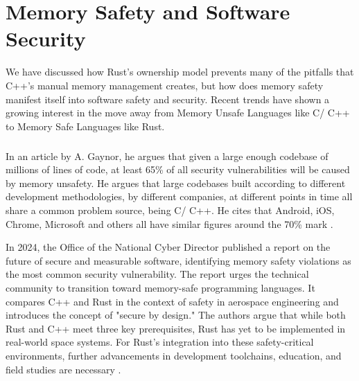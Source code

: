 \chapter{Memory Safety and Software Security}
\label{chap:safety}

We have discussed how Rust's ownership model prevents many of the pitfalls that C++'s manual memory management creates, but how does memory safety manifest itself into software safety and security. Recent trends have shown a growing interest in the move away from Memory Unsafe Languages like C/ C++ to Memory Safe Languages like Rust.

\paragraph{}

In an article by A. Gaynor, he argues that given a large enough codebase of millions of lines of code, at least 65\% of all security vulnerabilities will be caused by memory unsafety. He argues that large codebases built according to different development methodologies, by different companies, at different points in time all share a common problem source, being C/ C++. He cites that  Android, iOS, Chrome, Microsoft and others all have similar figures around the 70\% mark \cite[]{WhatScienceCan}.

In 2024, the Office of the National Cyber Director published a report on the future of secure and measurable software, identifying memory safety violations as the most common security vulnerability. The report urges the technical community to transition toward memory-safe programming languages. It compares C++ and Rust in the context of safety in aerospace engineering and introduces the concept of "secure by design." The authors argue that while both Rust and C++ meet three key prerequisites, Rust has yet to be implemented in real-world space systems. For Rust's integration into these safety-critical environments, further advancements in development toolchains, education, and field studies are necessary \cite[]{theofficeofthewhitehouseBackBuildingBlocks2024}.

\paragraph{}

